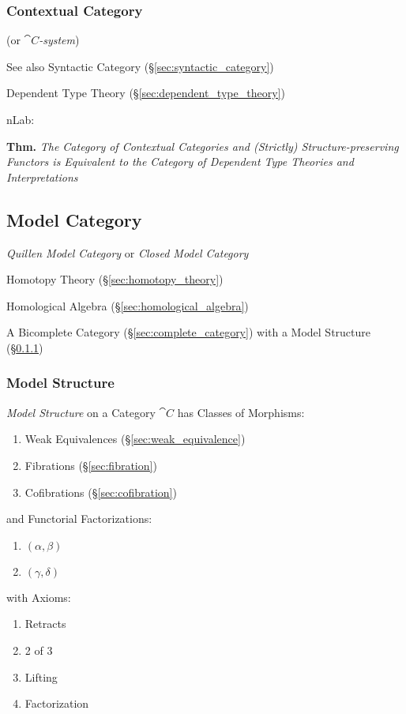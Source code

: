 \subsubsection{Contextual Category}\label{sec:contextual_category}

(or \emph{$\cat{C}$-system})

\fist See also Syntactic Category (\S\ref{sec:syntactic_category})

Dependent Type Theory (\S\ref{sec:dependent_type_theory})

nLab:

\textbf{Thm.} \emph{The Category of Contextual Categories and
  (Strictly) Structure-preserving Functors is Equivalent to the
  Category of Dependent Type Theories and Interpretations} %



\subsection{Model Category}\label{sec:model_category}

\emph{Quillen Model Category} or \emph{Closed Model Category}

Homotopy Theory (\S\ref{sec:homotopy_theory})

Homological Algebra (\S\ref{sec:homological_algebra})

A Bicomplete Category (\S\ref{sec:complete_category}) with a Model
Structure (\S\ref{sec:model_structure})



\subsubsection{Model Structure}\label{sec:model_structure}

\emph{Model Structure} on a Category $\cat{C}$ has Classes of
Morphisms:
\begin{enumerate}
  \item Weak Equivalences (\S\ref{sec:weak_equivalence})
  \item Fibrations (\S\ref{sec:fibration})
  \item Cofibrations (\S\ref{sec:cofibration})
\end{enumerate}
and Functorial Factorizations:
\begin{enumerate}
  \item $(\alpha,\beta)$
  \item $(\gamma,\delta)$
\end{enumerate}
with Axioms:
\begin{enumerate}
  \item Retracts
  \item 2 of 3
  \item Lifting
  \item Factorization
\end{enumerate} %




